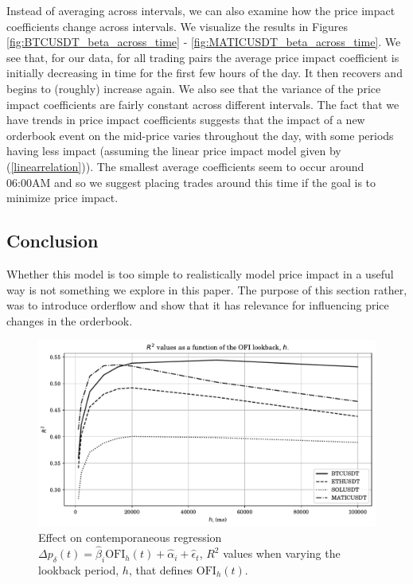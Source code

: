 Instead of averaging across intervals, we can also examine how the price impact coefficients change
across intervals. We visualize the results in Figures \ref{fig:BTCUSDT_beta_across_time} - \ref{fig:MATICUSDT_beta_across_time}.
We see that, for our data, for all trading pairs the average price impact coefficient is initially decreasing in time
for the first few hours of the day. It then recovers and begins to (roughly) increase again.
We also see that the variance of the price impact coefficients are fairly constant across different intervals.
The fact that we have trends in price impact coefficients suggests that
the impact of a new orderbook event on the mid-price varies throughout the day, with
some periods having less impact (assuming the linear price impact model given by (\ref{linearrelation})).
The smallest average coefficients seem to occur around 06:00AM and so we suggest placing trades around this time
if the goal is to minimize price impact.

\subsection{Conclusion}
Whether this model is too simple to realistically model price impact in a useful way is not something we explore in this paper.
The purpose of this section rather, was to introduce orderflow and show that it has relevance for influencing price changes in the orderbook.


\begin{figure}[htpb]
   \centering
   \includegraphics[width=1.0\textwidth]{./images/OFI_r2_h.pdf}
   \caption{Effect on contemporaneous regression $\Delta p_{\delta}(t) = \hat{\beta}_i \text{OFI}_h(t) + \hat{\alpha}_i + \hat{\epsilon}_t$,
       $R^2$ values when varying the lookback period, $h$, that defines $\text{OFI}_h(t)$.
    }
   \label{r2_h}
\end{figure}

